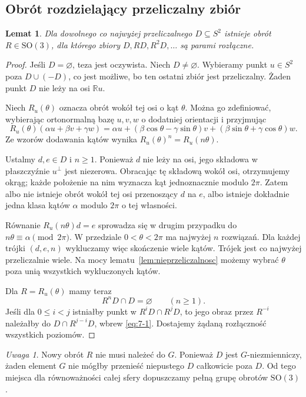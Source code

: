 \documentclass[11pt,a4paper]{article}
\numberwithin{equation}{section}
\theoremstyle{plain}
\newtheorem{lemat}[twierdzenie]{Lemat}
\theoremstyle{definition}
\theoremstyle{remark}
\newtheorem{uwaga}[twierdzenie]{Uwaga}
\newcommand{\R}{\mathbb R}
\begin{document}
\subsection{Obrót rozdzielający przeliczalny zbiór}
\begin{lemat}\label{lem:obrot-rozdzielajacy}
Dla dowolnego co najwyżej przeliczalnego $D\subseteq S^2$ istnieje obrót $R\in\mathrm{SO}(3)$, dla którego zbiory $D,RD,R^2D,\ldots$ są parami rozłączne.
\end{lemat}
\begin{proof}
Jeśli $D=\varnothing$, teza jest oczywista. Niech $D\ne\varnothing$. Wybieramy punkt $u\in S^2$ poza $D\cup(-D)$, co jest możliwe, bo ten ostatni zbiór jest przeliczalny. Żaden punkt $D$ nie leży na osi $\R u$.

Niech $R_u(\theta)$ oznacza obrót wokół tej osi o kąt $\theta$. Można go zdefiniować, wybierając ortonormalną bazę $u,v,w$ o dodatniej orientacji i przyjmując
\[
 R_u(\theta)(\alpha u+\beta v+\gamma w)=\alpha u+
 (\beta\cos\theta-\gamma\sin\theta)v+
 (\beta\sin\theta+\gamma\cos\theta)w.
\]
Ze wzorów dodawania kątów wynika $R_u(\theta)^n=R_u(n\theta)$.

Ustalmy $d,e\in D$ i $n\ge1$. Ponieważ $d$ nie leży na osi, jego składowa w płaszczyźnie $u^\perp$ jest niezerowa. Obracając tę składową wokół osi, otrzymujemy okrąg; każde położenie na nim wyznacza kąt jednoznacznie modulo $2\pi$. Zatem albo nie istnieje obrót wokół tej osi przenoszący $d$ na $e$, albo istnieje dokładnie jedna klasa kątów $\alpha$ modulo $2\pi$ o tej własności.

Równanie $R_u(n\theta)d=e$ sprowadza się w drugim przypadku do $n\theta\equiv\alpha\pmod{2\pi}$. W przedziale $0<\theta<2\pi$ ma najwyżej $n$ rozwiązań. Dla każdej trójki $(d,e,n)$ wykluczamy więc skończenie wiele kątów. Trójek jest co najwyżej przeliczalnie wiele. Na mocy lematu~\ref{lem:nieprzeliczalnosc} możemy wybrać $\theta$ poza unią wszystkich wykluczonych kątów.

Dla $R=R_u(\theta)$ mamy teraz
\begin{equation}\label{eq:7-1}
 R^nD\cap D=\varnothing\qquad(n\ge1).
\end{equation}
Jeśli dla $0\le i<j$ istniałby punkt w $R^iD\cap R^jD$, to jego obraz przez $R^{-i}$ należałby do $D\cap R^{j-i}D$, wbrew \eqref{eq:7-1}. Dostajemy żądaną rozłączność wszystkich poziomów.
\end{proof}
\begin{uwaga}
Nowy obrót $R$ nie musi należeć do $G$. Ponieważ $D$ jest $G$-niezmienniczy, żaden element $G$ nie mógłby przenieść niepustego $D$ całkowicie poza $D$. Od tego miejsca dla równoważności całej sfery dopuszczamy pełną grupę obrotów $\mathrm{SO}(3)$.
\end{uwaga}
\end{document}
